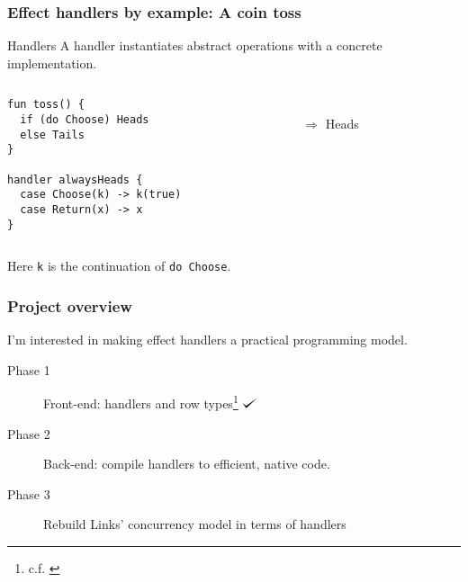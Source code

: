 \documentclass[10pt,compress]{beamer}
\def\checkmark{\tikz\fill[scale=0.4](0,.35) -- (.25,0) -- (1,.7) -- (.25,.15) -- cycle;}
\begin{document}
\begin{frame}[fragile]
  \frametitle{Effect handlers by example: A coin toss}
\begin{block}{Handlers}
A handler instantiates abstract operations with a concrete implementation.
\end{block}
\begin{columns}
\begin{column}{0.5\textwidth}
\begin{lstlisting}
fun toss() {
  if (do Choose) Heads
  else Tails
}

handler alwaysHeads {
  case Choose(k) -> k(true)
  case Return(x) -> x
}
\end{lstlisting}
\end{column}
\begin{column}{0.5\textwidth}
\\
$\Longrightarrow$ Heads
\end{column}
\end{columns}
Here \lstinline$k$ is the continuation of \lstinline$do Choose$.
\end{frame}

\begin{frame}
  \frametitle{Project overview}
I'm interested in making effect handlers a practical programming model.
\begin{description}
  \item[Phase 1] Front-end: handlers and row types\footnote{c.f. \citet{Hillerstrom2016}} $\checkmark$
  \item[Phase 2] Back-end: compile handlers to efficient, native code.
  \item[Phase 3] Rebuild Links' concurrency model in terms of handlers
\end{description}
\end{frame}
\end{document}

